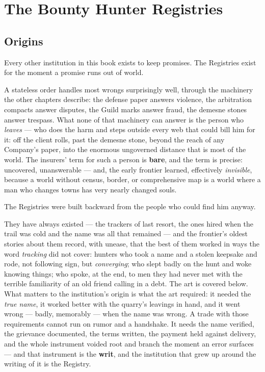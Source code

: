 \section{The Bounty Hunter Registries}

\subsection{Origins}

Every other institution in this book exists to keep promises. The Registries exist for the moment a promise runs out of world.

A stateless order handles most wrongs surprisingly well, through the machinery the other chapters describe: the defense paper answers violence, the arbitration compacts answer disputes, the Guild marks answer fraud, the demesne stones answer trespass. What none of that machinery can answer is the person who \textit{leaves} --- who does the harm and steps outside every web that could bill him for it: off the client rolls, past the demesne stone, beyond the reach of any Company's paper, into the enormous ungoverned distance that is most of the world. The insurers' term for such a person is \textbf{bare}, and the term is precise: uncovered, unanswerable --- and, the early frontier learned, effectively \textit{invisible}, because a world without census, border, or comprehensive map is a world where a man who changes towns has very nearly changed souls.

The Registries were built backward from the people who could find him anyway.

They have always existed --- the trackers of last resort, the ones hired when the trail was cold and the name was all that remained --- and the frontier's oldest stories about them record, with unease, that the best of them worked in ways the word \textit{tracking} did not cover: hunters who took a name and a stolen keepsake and rode, not following sign, but \textit{converging}; who slept badly on the hunt and woke knowing things; who spoke, at the end, to men they had never met with the terrible familiarity of an old friend calling in a debt. The art is covered below. What matters to the institution's origin is what the art required: it needed the \textit{true name}, it worked better with the quarry's leavings in hand, and it went wrong --- badly, memorably --- when the name was wrong. A trade with those requirements cannot run on rumor and a handshake. It needs the name verified, the grievance documented, the terms written, the payment held against delivery, and the whole instrument voided root and branch the moment an error surfaces --- and that instrument is the \textbf{writ}, and the institution that grew up around the writing of it is the Registry.

